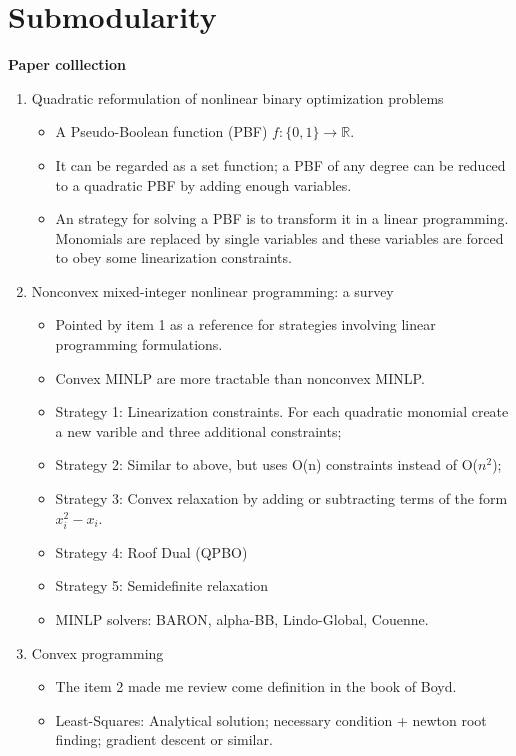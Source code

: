 \chapter{Submodularity}\label{chapter:submodularity}

\textbf{Paper colllection}
\begin{enumerate}
	\item{Quadratic reformulation of nonlinear binary optimization problems}
	\begin{itemize}
		\item{A Pseudo-Boolean function (PBF) $f:\{0,1\}\rightarrow \mathbb{R}$.}
		\item{It can be regarded as a set function; a PBF of any degree can be reduced to a quadratic PBF by adding enough variables.}
		\item{An strategy for solving a PBF is to transform it in a linear programming. Monomials are replaced by single variables and these variables are forced to obey some linearization constraints. }
	\end{itemize}
	\item{Nonconvex mixed-integer nonlinear programming: a survey}
	\begin{itemize}
		\item{Pointed by item 1 as a reference for strategies involving linear programming formulations.}
		\item{Convex MINLP are more tractable than nonconvex MINLP.}
		\item{Strategy 1: Linearization constraints. For each quadratic monomial create a new varible and three additional constraints;}
		\item{Strategy 2: Similar to above, but uses O(n) constraints instead of O($n^2$);}
		\item{Strategy 3: Convex relaxation by adding or subtracting terms of the form $x_i^2-x_i$.}
		\item{Strategy 4: Roof Dual (QPBO) }
		\item{Strategy 5: Semidefinite relaxation}
		\item{MINLP solvers: BARON, alpha-BB, Lindo-Global, Couenne.}
	\end{itemize}
	\item{Convex programming}
	\begin{itemize}
		\item{The item 2 made me review come definition in the book of Boyd.}
		\item{Least-Squares: Analytical solution; necessary condition + newton root finding; gradient descent or similar.}

\end{itemize}
\end{enumerate}
